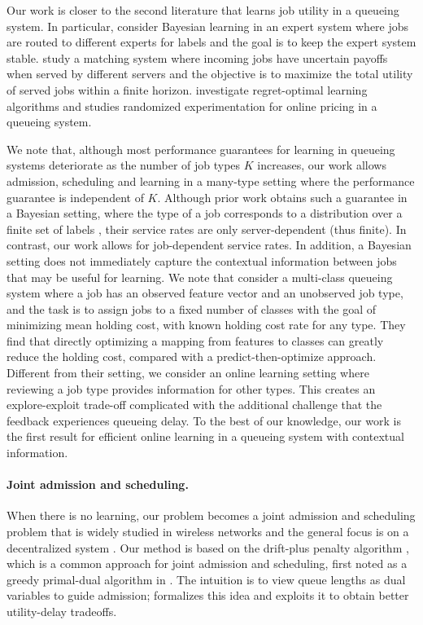 Our work is closer to the second literature that learns job utility in a queueing system. In particular, \cite{massoulie2018capacity, ShahGMV20} consider Bayesian learning in an expert system where jobs are routed to different experts for labels and the goal is to keep the expert system stable. \cite{johari2021matching,hsu2022integrated,fu2022optimal} study a matching system where incoming jobs have uncertain payoffs when served by different servers and the objective is to maximize the total utility of served jobs within a finite horizon. \cite{jia2022online,Jia0S22,chen2023online} investigate regret-optimal learning algorithms and \cite{li2023experimenting} studies randomized experimentation for online pricing in a queueing system. 

We note that, although most performance guarantees for learning in queueing systems deteriorate as the number of job types $K$ increases, our work allows admission, scheduling and learning in a many-type setting where the performance guarantee is independent of $K$. Although prior work obtains such a guarantee in a Bayesian setting, where the type of a job corresponds to a distribution over a finite set of labels \citep{argon2009priority,massoulie2018capacity,ShahGMV20}, their service rates are only server-dependent (thus finite). In contrast, our work allows for job-dependent service rates. In addition, a Bayesian setting does not immediately capture the contextual information between jobs that may be useful for learning. We note that \cite{singh2022feature} consider a multi-class queueing system where a job has an observed feature vector and an unobserved job type, and the task is to assign jobs to a fixed number of classes with the goal of minimizing mean holding cost, with known holding cost rate for any type. They find that directly optimizing a mapping from features to classes can greatly reduce the holding cost, compared with a predict-then-optimize approach. Different from their setting, we consider an online learning setting where reviewing a job type provides information for other types. This creates an explore-exploit trade-off complicated with the additional challenge that the feedback experiences queueing delay. To the best of our knowledge, our work is the first result for efficient online learning in a queueing system with contextual information.
 
\paragraph{Joint admission and scheduling.} When there is no learning, our problem becomes a joint admission and scheduling problem that is widely studied in wireless networks and the general focus is on a decentralized system \citep{kelly1998rate,lin2006tutorial}. Our method is based on the drift-plus penalty algorithm \citep{neely2022stochastic}, which is a common approach for joint admission and scheduling, first noted as a greedy primal-dual algorithm in \cite{stolyar2005maximizing}. The intuition is to view queue lengths as dual variables to guide admission; \cite{huang2009delay} formalizes this idea and exploits it to obtain better utility-delay tradeoffs. 